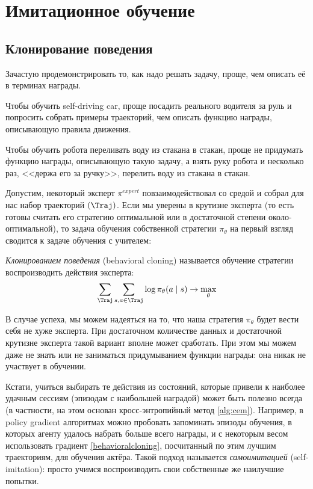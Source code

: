 \section{Имитационное обучение}\label{sec:imitationlearning}

\subsection{Клонирование поведения}

Зачастую продемонстрировать то, как надо решать задачу, проще, чем описать её в терминах награды.

\begin{example}
Чтобы обучить self-driving car, проще посадить реального водителя за руль и попросить собрать примеры траекторий, чем описать функцию награды, описывающую правила движения.
\end{example}

\begin{example}
Чтобы обучить робота переливать воду из стакана в стакан, проще не придумать функцию награды, описывающую такую задачу, а взять руку робота и несколько раз, <<держа его за ручку>>, перелить воду из стакана в стакан.
\end{example}

Допустим, некоторый эксперт $\pi^{expert}$ повзаимодействовал со средой и собрал для нас набор траекторий $(\Traj)$. Если мы уверены в крутизне эксперта (то есть готовы считать его стратегию оптимальной или в достаточной степени около-оптимальной), то задача обучения собственной стратегии $\pi_{\theta}$ на первый взгляд сводится к задаче обучения с учителем:

\begin{definition}
\emph{Клонированием поведения} (behavioral cloning) называется обучение стратегии воспроизводить действия эксперта:
\begin{equation}\label{behavioralcloning}
\sum_{\Traj} \sum_{s, a \in \Traj} \log \pi_{\theta}(a \mid s) \to \max_{\theta}
\end{equation}
\end{definition}

В случае успеха, мы можем надеяться на то, что наша стратегия $\pi_{\theta}$ будет вести себя не хуже эксперта. При достаточном количестве данных и достаточной крутизне эксперта такой вариант вполне может сработать. При этом мы можем даже не знать или не заниматься придумыванием функции награды: она никак не участвует в обучении.

\begin{remark}
Кстати, учиться выбирать те действия из состояний, которые привели к наиболее удачным сессиям (эпизодам с наибольшей наградой) может быть полезно всегда (в частности, на этом основан кросс-энтропийный метод \ref{alg:cem}). Например, в policy gradient алгоритмах можно пробовать запоминать эпизоды обучения, в которых агенту удалось набрать больше всего награды, и с некоторым весом использовать градиент \eqref{behavioralcloning}, посчитанный по этим лучшим траекториям, для обучения актёра. Такой подход называется \emph{самоимитацией} (self-imitation): просто учимся воспроизводить свои собственные же наилучшие попытки.
\end{remark}

